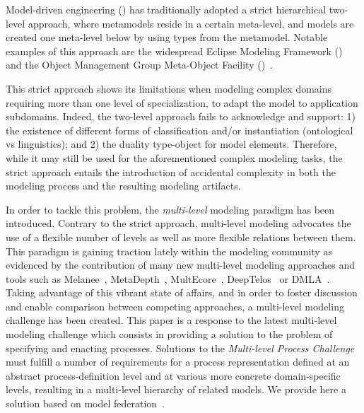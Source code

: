 Model-driven engineering (\MDE) has traditionally adopted a strict hierarchical two-level approach, where metamodels reside in a certain meta-level, and models are created one meta-level below by using types from the metamodel. Notable examples of this approach are the widespread Eclipse Modeling Framework (\EMF)~\parencite{emf} and the Object Management Group Meta-Object Facility (\MOF)~\parencite{omg2013mof}.

This strict approach shows its limitations when modeling complex domains requiring more than one level of specialization, \eg to adapt the model to application subdomains. Indeed, the two-level approach fails to acknowledge and support: 1) the existence of different forms of classification and/or instantiation (\eg ontological vs linguistics); and 2) the duality type-object for model elements. Therefore, while it may still be used for the aforementioned complex modeling tasks, the strict approach entails the introduction of accidental complexity in both the modeling process and the resulting modeling artifacts.

In order to tackle this problem, the \emph{multi-level} modeling paradigm has been introduced. Contrary to the strict approach, multi-level modeling advocates the use of a flexible number of levels as well as more flexible relations between them. This paradigm is gaining traction lately within the modeling community as evidenced by the contribution of many new multi-level modeling approaches and tools such as Melanee~\parencite{melanee}, MetaDepth~\parencite{metadepth}, MultEcore~\parencite{multecore2016}, DeepTelos~\parencite{deeptelos2016} or DMLA~\parencite{dmla2017}. Taking advantage of this vibrant state of affairs, and in order to foster discussion and enable comparison between competing approaches, a multi-level modeling challenge has been created. This paper is a response to the latest multi-level modeling challenge
which consists in providing a solution to the problem of specifying and enacting processes. Solutions to the \emph{Multi-level Process Challenge} must fulfill a number of requirements for a process representation defined at an abstract process-definition level and at various more concrete domain-specific levels, resulting in a multi-level hierarchy of related models. We provide here a solution based on model federation~\parencite{Golra2016-federation}.

